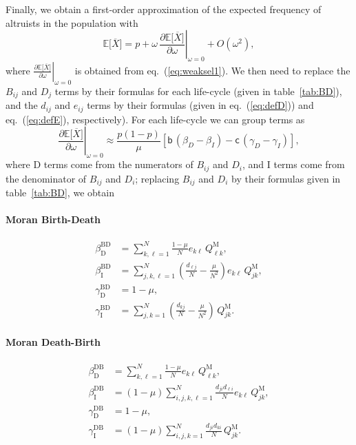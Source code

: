 \documentclass[11pt, letterpaper]{article}
\renewcommand{\eqref}[1]{\textup{{\normalfont eq.~(\ref{#1}}\normalfont)}}
\newcommand{\deriv}[2]{\partial_{#2}\!{#1}\,}
\newcommand{\derivv}[3]{\left.\frac{\partial #1}{\partial #2}\right |_{#3=0}} %
\newcommand{\Esp}[1]{\mathbb{E}\big[ #1\big]}%
\newcommand{\bigO}[1]{O\left( #1 \right)}
\newcommand{\bb}{\mathsf{b}}
\newcommand{\cc}{\mathsf{c}}
\newcommand{\direct}{\mathrm{D}}
\newcommand{\indirect}{\mathrm{I}}
\newcommand{\Moran}{\textrm{M}}
\newcommand{\BD}{\textrm{BD}}
\newcommand{\DB}{\textrm{DB}}
\begin{document}
Finally, we obtain a first-order approximation of the expected frequency of altruists in the population with 
\begin{equation}\label{eq:EXgeneric}
\Esp{\overline{X}} = p + \omega \,  \derivv{\Esp{\overline{X}}}{\omega}{\omega} + \bigO{\omega^2},
\end{equation}
where $\derivv{\Esp{\overline{X}}}{\omega}{\omega}$ is obtained from \eqref{eq:weaksel1}. We then need to replace the $B_{ij}$ and $D_{j}$ terms by their formulas for each life-cycle (given in table~\ref{tab:BD}), and the $d_{ij}$ and $e_{ij}$ terms by their formulas (given in \eqref{eq:defD}) and \eqref{eq:defE}, respectively). For each life-cycle we can group terms as
\begin{equation}
\derivv{\Esp{\overline{X}}}{\omega}{\omega} 
\approx 
\frac{p (1-p)}{\mu} \left[ \bb \, (\beta_{D} - \beta_{I}) - \cc \, (\gamma_{D} - \gamma_{I}) \right],
\end{equation}
%
where $\direct$ terms come from the numerators of $B_{ij}$ and $D_i$, and $\indirect$ terms come from the denominator of $B_{ij}$ and $D_i$; replacing $B_{ij}$ and $D_i$ by their formulas given in table~\ref{tab:BD}, we obtain
\paragraph{Moran Birth-Death}
\begin{subequations}
\begin{align}\label{eq:EXBDsums}
\beta_{\direct}^{\BD} &= \sum_{k,\ell=1}^N \frac{1-\mu}{N} e_{k\ell} \, Q_{\ell k}^{\Moran},\\
%
\beta_{\indirect}^{\BD} &= \sum_{j,k,\ell=1}^N \left(  \frac{d_{\ell j}}{N } - \frac{\mu}{N^2}  \right)e_{k\ell} \, Q_{jk}^{\Moran},\\
%
\gamma_{\direct}^{\BD} &= 1-\mu,\\
%
\gamma_{\indirect}^{\BD} &= \sum_{j,k=1}^N \left(  \frac{d_{kj}}{N } - \frac{\mu}{N^2}   \right) \, Q_{jk}^{\Moran} .
\end{align}
\end{subequations}

\paragraph{Moran Death-Birth}
\begin{subequations}
\begin{align}
\beta_{\direct}^{\DB} &= \sum_{k,\ell=1}^N \frac{1-\mu}{N} e_{k\ell} \, Q_{\ell k}^{\Moran},\\
%
\beta_{\indirect}^{\DB} &= (1-\mu) \sum_{i,j,k,\ell=1}^{N} \frac{ d_{ji} d_{\ell i}}{N}   e_{k\ell} \, Q_{jk}^{\Moran}, \\ 
%
\gamma_{\direct}^{\DB} &= 1-\mu,\\
%
\gamma_{\indirect}^{\DB} &= (1-\mu)\sum_{i,j,k=1}^N  \frac{ d_{ji} d_{ki}}{N }  \, Q_{jk}^{\Moran}.
\end{align}
\end{subequations}
\end{document}
